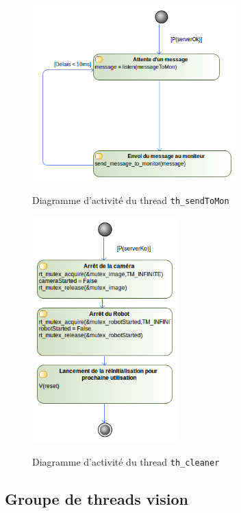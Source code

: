 \documentclass[11pt, a4paper]{paper}
\begin{document}
\begin{figure}[H]
\label{fig:th_sendToMon}
\begin{center}
{\includegraphics[width=0.7\textwidth]{./figures-pdf/th_sendToMon.png}}
{\caption{Diagramme d'activité du thread {\tt th\_sendToMon}}}
\end{center}
\end{figure}

\begin{figure}[H]
\label{fig:th_cleaner}
\begin{center}
{\includegraphics[width=0.5\textwidth]{./figures-pdf/th_cleaner}}
{\caption{Diagramme d'activité du thread {\tt th\_cleaner}}}
\end{center}
\end{figure}

\subsection{Groupe de threads vision}
\end{document}
